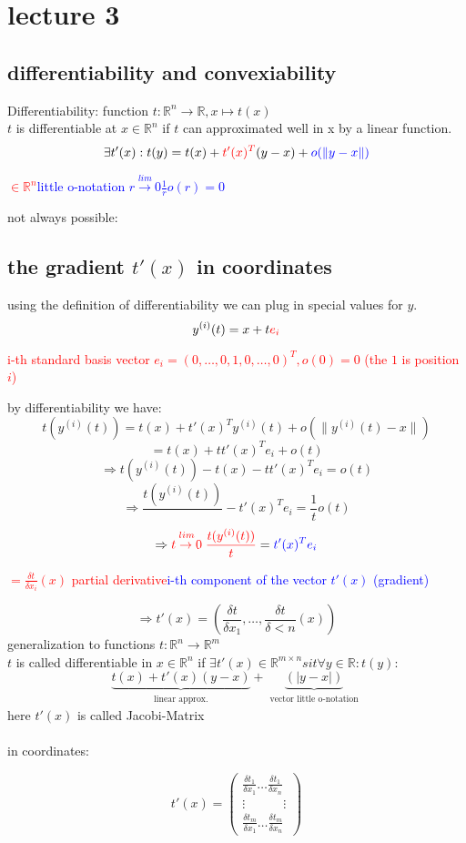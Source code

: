 
\section*{lecture 3}
\subsection*{differentiability and convexiability}

Differentiability: function $t: \mathbb{R}^n \rightarrow \mathbb{R}, x \mapsto t(x)$\\
$t$ is differentiable at $x \in \mathbb{R}^n$ if $t$ can approximated well in x by a linear function.
\[\exists t'(x): t(y) = t(x) + \textcolor{red}{t'(x)^T} (y-x) + \textcolor{blue}{o(\lVert y-x\lVert)}\]
\begin{center}
\textcolor{red}{$\in \mathbb{R}^n$}\space\space\textcolor{blue}{little o-notation $\stackrel{lim}{r \rightarrow 0} \frac{1}{r} o(r) = 0$} 
\end{center}
not always possible:
\subsection*{the gradient $t'(x)$ in coordinates}
using the definition of differentiability we can plug in special values for $y$.
\[y^{(i)}(t) = x + t\textcolor{red}{e_i}\]
\begin{center}
 \textcolor{red}{i-th standard basis vector $e_i = (0, \dots, 0,1,0, \dots ,0)^T, o(0)=0$ (the $1$ is position $i$)}
\end{center}
by differentiability we have:
\[t(y^{(i)}(t)) = t(x) + t'(x)^Ty^{(i)}(t) + o(\lVert y^{(i)}(t)-x\lVert)\]
\[= t(x) + tt'(x)^Te_i+o(t)\]
\[\Rightarrow t(y^{(i)}(t)) - t(x) - tt'(x)^Te_i = o(t)\]
\[\Rightarrow \frac{t(y^{(i)}(t))}{} - t'(x)^{T}e_i = \frac{1}{t} o(t)\]
\[\Rightarrow \textcolor{red}{\stackrel{lim}{t \rightarrow 0} \frac{t(y^{(i)}(t))}{t}} = \textcolor{blue}{t'(x)^Te_i}\]
\begin{center}
 \textcolor{red}{$= \frac{\delta t}{\delta x_i}(x)$ partial derivative}\space\space\textcolor{blue}{i-th component of the vector $t'(x)$ (gradient)}
\end{center}
\[\Rightarrow t'(x) = (\frac{\delta t}{\delta x_1}, \dots , \frac{\delta t}{\delta < n}(x))\]
generalization to functions $t: \mathbb{R}^n \rightarrow \mathbb{R}^m$\\
$t$ is called differentiable in $x \in \mathbb{R}^n$ if $\exists t'(x)\in\mathbb{R}^{m \times n} sit \forall y \in \mathbb{R}: t(y):$
\[ \underbrace{t(x)+t'(x)(y-x)}_{\substack{\text{linear approx.}}}+\underbrace{(|y-x|)}_{\substack{\text{vector little o-notation}}}\] 
here  $t'(x)$ is called Jacobi-Matrix\\\\

in coordinates:

\[ t'(x) =\left( \begin{array}{ccc}
\frac{\delta t_1}{\delta x_1} \dots  \frac{\delta t_1}{\delta x_n}\\
\vdots \quad \quad \quad \vdots\\
\frac{\delta t_m}{\delta x_1} \dots  \frac{\delta t_m}{\delta x_n} \end{array} \right)\] 
